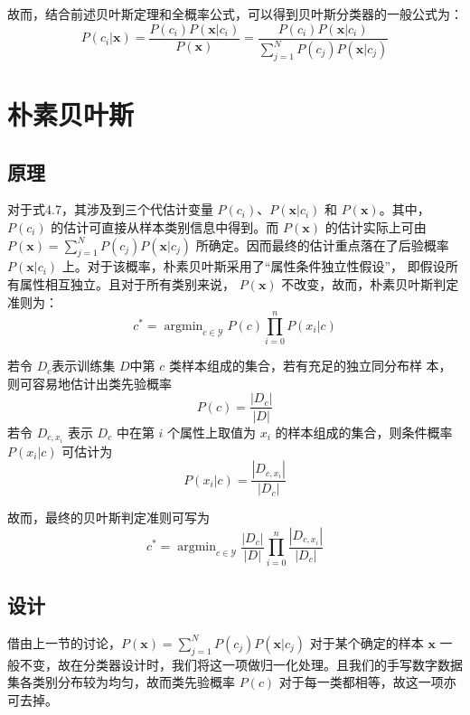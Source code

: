 \documentclass[UTF8, a4paper, 12pt]{report}
\begin{document}
			故而，结合前述贝叶斯定理和全概率公式，可以得到贝叶斯分类器的一般公式为：					\begin{equation}
				P(c_i|\bm{x})=\frac{P(c_i)P(\bm{x}|c_i)}{P(\bm{x})}=\frac{P(c_i)P(\bm{x}|c_i)}{\sum_{j=1}^{N}{P(c_j)P(\bm{x}|c_j)}}
			\end{equation}

	\section{朴素贝叶斯}
		\subsection{原理}
			对于式4.7，其涉及到三个代估计变量 $P(c_i)$、$P(\bm{x}|c_i)$ 和 $P(\bm{x})$。其中， $P(c_i)$ 的估计可直接从样本类别信息中得到。而 $P(\bm{x})$ 的估计实际上可由 $P(\bm{x})=\sum_{j=1}^{N}{P(c_j)P(\bm{x}|c_j)}$ 所确定。因而最终的估计重点落在了后验概率$P(\bm{x}|c_i)$ 上。对于该概率，朴素贝叶斯采用了“属性条件独立性假设”， 即假设所有属性相互独立。且对于所有类别来说， $P(\bm{x})$ 不改变，故而，朴素贝叶斯判定准则为：
			\begin{equation}
				c^* = \mathop{\arg\min}_{c \in \mathcal{Y}} {P(c)\prod \limits_{i=0}^n {P(x_i|c)}}
			\end{equation}

			若令 $D_c$表示训练集 $D$中第 $c$ 类样本组成的集合，若有充足的独立同分布样
本，则可容易地估计出类先验概率
			\begin{equation}
				P(c) = \frac{|D_c|}{|D|}
			\end{equation}
若令 $D_{c, x_i}$ 表示 $D_c$ 中在第 $i$ 个属性上取值为 $x_i$ 的样本组成的集合，则条件概率 $P(x_i|c)$ 可估计为
			\begin{equation}
				P(x_i|c) = \frac{|D_{c, x_i}|}{|D_c|}
			\end{equation}

			故而，最终的贝叶斯判定准则可写为
			\begin{equation}
				c^* = \mathop{\arg\min}_{c \in \mathcal{Y}} {\frac{|D_c|}{|D|} \prod \limits_{i=0}^n {\frac{|D_{c, x_i}|}{|D_c|}}}
			\end{equation}

		\subsection{设计}
			借由上一节的讨论，$P(\bm{x})=\sum_{j=1}^{N}{P(c_j)P(\bm{x}|c_j)}$ 对于某个确定的样本 $\bm{x}$ 一般不变，故在分类器设计时，我们将这一项做归一化处理。且我们的手写数字数据集各类别分布较为均匀，故而类先验概率 $P(c)$ 对于每一类都相等，故这一项亦可去掉。
\end{document}
